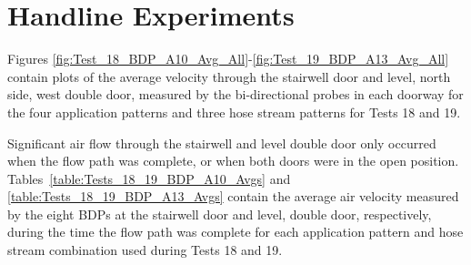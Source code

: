 \documentclass[12pt,oneside]{book}
\begin{document}
\section{Handline Experiments}
\label{sec:handline_results}

Figures \ref{fig:Test_18_BDP_A10_Avg_All}-\ref{fig:Test_19_BDP_A13_Avg_All} contain plots of the average velocity through the stairwell door and  level, north side, west double door, measured by the bi-directional probes in each doorway for the four application patterns and three hose stream patterns for Tests 18 and 19. 





Significant air flow through the stairwell and  level double door only occurred when the flow path was complete, or when both doors were in the open position. Tables~\ref{table:Tests_18_19_BDP_A10_Avgs} and \ref{table:Tests_18_19_BDP_A13_Avgs} contain the average air velocity measured by the eight BDPs at the stairwell door and  level, double door, respectively, during the time the flow path was complete for each application pattern and hose stream combination used during Tests 18 and 19.
\end{document}
